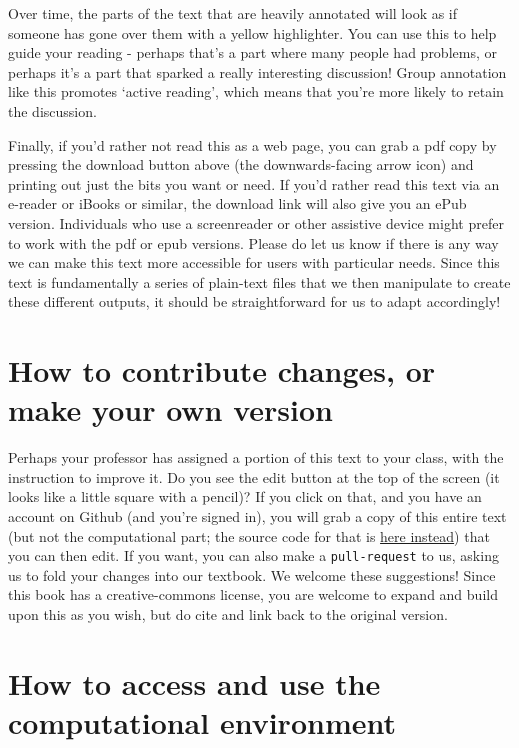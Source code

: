 \documentclass[english,]{book}
\begin{document}
Over time, the parts of the text that are heavily annotated will look as
if someone has gone over them with a yellow highlighter. You can use
this to help guide your reading - perhaps that's a part where many
people had problems, or perhaps it's a part that sparked a really
interesting discussion! Group annotation like this promotes `active
reading', which means that you're more likely to retain the discussion.

Finally, if you'd rather not read this as a web page, you can grab a pdf
copy by pressing the download button above (the downwards-facing arrow
icon) and printing out just the bits you want or need. If you'd rather
read this text via an e-reader or iBooks or similar, the download link
will also give you an ePub version. Individuals who use a screenreader
or other assistive device might prefer to work with the pdf or epub
versions. Please do let us know if there is any way we can make this
text more accessible for users with particular needs. Since this text is
fundamentally a series of plain-text files that we then manipulate to
create these different outputs, it should be straightforward for us to
adapt accordingly!

\section*{How to contribute changes, or make your own
version}\label{how-to-contribute-changes-or-make-your-own-version}

Perhaps your professor has assigned a portion of this text to your
class, with the instruction to improve it. Do you see the edit button at
the top of the screen (it looks like a little square with a pencil)? If
you click on that, and you have an account on Github (and you're signed
in), you will grab a copy of this entire text (but not the computational
part; the source code for that is \href{insert-the-link}{here instead})
that you can then edit. If you want, you can also make a
\texttt{pull-request} to us, asking us to fold your changes into our
textbook. We welcome these suggestions! Since this book has a
creative-commons license, you are welcome to expand and build upon this
as you wish, but do cite and link back to the original version.

\section*{How to access and use the computational
environment}\label{how-to-access-and-use-the-computational-environment}
\end{document}

